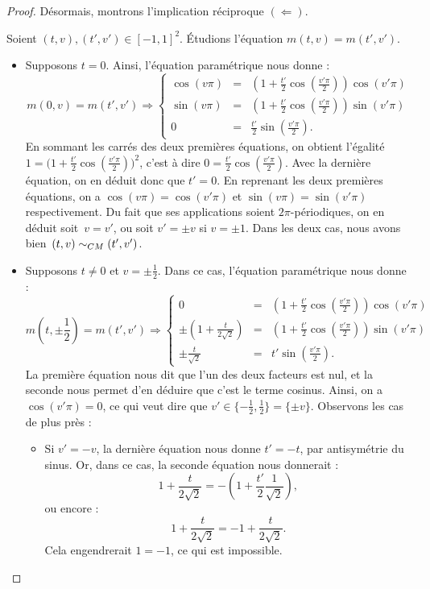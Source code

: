 \documentclass[hidelinks, 10pt]{article}
\begin{document}
\begin{proof}
\bigskip Désormais, montrons l'implication réciproque $(\Leftarrow)$.

Soient $(t,v),(t',v')\in[-1,1]^2$. Étudions l'équation $m(t,v)=m(t',v')$. \begin{itemize}
\item Supposons $t=0$. Ainsi, l'équation paramétrique nous donne : \[m(0,v)=m(t',v')\Longrightarrow\left\{\begin{matrix}
\cos(v\pi)&=&\left(1+\frac{t'}{2}\cos(\frac{v'\pi}{2})\right)\cos(v'\pi)\\ 
\sin(v\pi)&=&\left(1+\frac{t'}{2}\cos(\frac{v'\pi}{2})\right)\sin(v'\pi)\\ 
0&=&\frac{t'}{2}\sin(\frac{v'\pi}{2}).
\end{matrix}\right.\]En sommant les carrés des deux premières équations, on obtient l'égalité~$1=\big(1+\frac{t'}{2}\cos(\frac{v'\pi}{2})\big)^2$, c'est à dire $0=\frac{t'}{2}\cos(\frac{v'\pi}{2})$. Avec la dernière équation, on en déduit donc que $t'=0$. En reprenant les deux premières équations, on a $\cos(v\pi)=\cos(v'\pi)$ et $\sin(v\pi)=\sin(v'\pi)$ respectivement. Du fait que ses applications soient $2\pi$-périodiques, on en déduit soit~$v=v'$, ou soit $v'=\pm v$ si $v=\pm1$. Dans les deux cas, nous avons bien~$(t,v)\sim_{CM}(t',v')$.
\item Supposons $t\neq 0$ et $v=\pm\frac{1}{2}$. Dans ce cas, l'équation paramétrique nous donne : \[m\left(t,\pm\frac{1}{2}\right)=m(t',v')\Longrightarrow\left\{\begin{matrix}
0&=&\left(1+\frac{t'}{2}\cos(\frac{v'\pi}{2})\right)\cos(v'\pi)\\ 
\pm\left(1+\frac{t}{2\sqrt{2}}\right)&=&\left(1+\frac{t'}{2}\cos(\frac{v'\pi}{2})\right)\sin(v'\pi)\\ 
\pm\frac{t}{\sqrt{2}}&=&t'\sin\left(\frac{v'\pi}{2}\right).
\end{matrix}\right.\]La première équation nous dit que l'un des deux facteurs est nul, et la seconde nous permet d'en déduire que c'est le terme cosinus. Ainsi, on a~$\cos(v'\pi)=0$, ce qui veut dire que $v'\in\{-\frac{1}{2},\frac{1}{2}\}=\{\pm v\}$. Observons les cas de plus près : \begin{itemize}
    \item Si $v'=-v$, la dernière équation nous donne $t'=-t$, par antisymétrie du sinus. Or, dans ce cas, la seconde équation nous donnerait : \[1+\frac{t}{2\sqrt{2}}=-\left(1+\frac{t'}{2}\frac{1}{\sqrt{2}}\right),\]ou encore :\[1+\frac{t}{2\sqrt{2}}=-1+\frac{t}{2\sqrt{2}}.\]Cela engendrerait $1=-1$, ce qui est impossible.

\end{itemize}
\end{itemize}
\end{proof}
\end{document}
